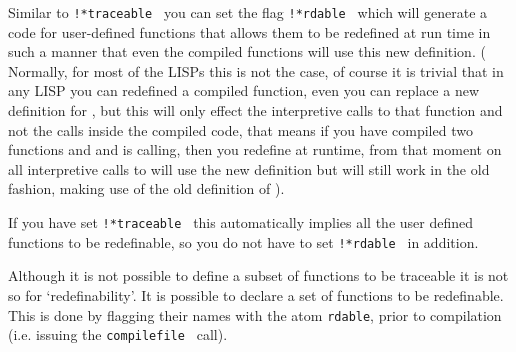 Similar to  {\tt   !*traceable } you can set the flag  {\tt !*rdable }
which will generate a \C code for user-defined functions that allows
them to be redefined at run time in such a manner that even the
compiled functions will use this new definition.
( Normally, for most of the LISPs this is
not the case, of course it is trivial that in any LISP you
can redefined a compiled function, even you can replace a new definition
for , but this will only effect the interpretive calls to that function
and not the calls inside the compiled code, that means if you have
compiled two functions  and  and  is calling, then
you  redefine   at runtime, from that moment on all interpretive calls
to  will use the new definition but  will still work in the old
fashion, making use of the old definition of ).

If you have set  {\tt    !*traceable  }  this  automatically  implies
all the user defined functions to be redefinable, so you do not have to
set   {\tt !*rdable } in addition.

Although it is not possible to define a subset of functions to be
traceable it is not so  for `redefinability'. It is possible to
declare a set of functions to be redefinable. This is done by flagging
their  names with the atom {\tt rdable}, prior to compilation (i.e. issuing
the {\tt compilefile } call).


